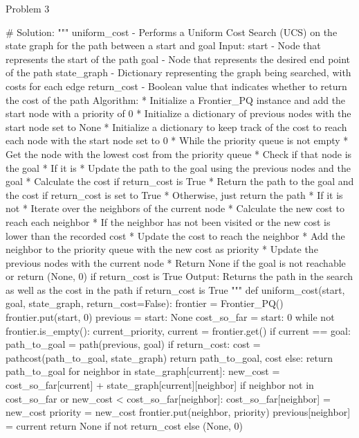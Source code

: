 \begin{problem}{Problem 3}
\begin{highlight}[Solution]
\begin{code}[Python]
    # Solution:
    """ uniform_cost - Performs a Uniform Cost Search (UCS) on the state graph for the path between a start and goal
        Input:
            start - Node that represents the start of the path
            goal - Node that represents the desired end point of the path
            state_graph - Dictionary representing the graph being searched, with costs for each edge
            return_cost - Boolean value that indicates whether to return the cost of the path
        Algorithm:
            * Initialize a Frontier_PQ instance and add the start node with a priority of 0
            * Initialize a dictionary of previous nodes with the start node set to None
            * Initialize a dictionary to keep track of the cost to reach each node with the start node set to 0
            * While the priority queue is not empty
                * Get the node with the lowest cost from the priority queue
                * Check if that node is the goal
                * If it is
                    * Update the path to the goal using the previous nodes and the goal
                    * Calculate the cost if return_cost is True
                    * Return the path to the goal and the cost if return_cost is set to True
                    * Otherwise, just return the path
                * If it is not
                    * Iterate over the neighbors of the current node
                    * Calculate the new cost to reach each neighbor
                    * If the neighbor has not been visited or the new cost is lower than the recorded cost
                        * Update the cost to reach the neighbor
                        * Add the neighbor to the priority queue with the new cost as priority
                        * Update the previous nodes with the current node
            * Return None if the goal is not reachable or return (None, 0) if return_cost is True
        Output:
            Returns the path in the search as well as the cost in the path if return_cost is True
    """
    def uniform_cost(start, goal, state_graph, return_cost=False):
        frontier = Frontier_PQ()
        frontier.put(start, 0)
        previous = {start: None}
        cost_so_far = {start: 0}
        while not frontier.is_empty():
            current_priority, current = frontier.get()
            if current == goal:
                path_to_goal = path(previous, goal)
                if return_cost:
                    cost = pathcost(path_to_goal, state_graph)
                    return path_to_goal, cost
                else:
                    return path_to_goal
            for neighbor in state_graph[current]:
                new_cost = cost_so_far[current] + state_graph[current][neighbor]
                if neighbor not in cost_so_far or new_cost < cost_so_far[neighbor]:
                    cost_so_far[neighbor] = new_cost
                    priority = new_cost
                    frontier.put(neighbor, priority)
                    previous[neighbor] = current
        return None if not return_cost else (None, 0)
    \end{code}
    \end{highlight}
\end{problem}

